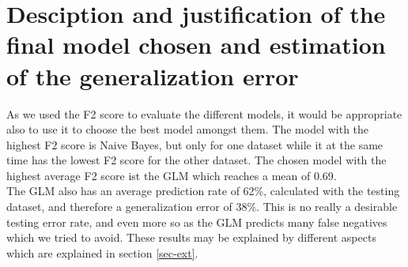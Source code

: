 
\section{Desciption and justification of the final model chosen and estimation of the generalization error}

As we used the F2 score to evaluate the different models, it would be appropriate also to use it to choose the best model amongst them. The model with the highest F2 score is Naive Bayes, but only for one dataset while it at the same time has the lowest F2 score for the other dataset. The chosen model with the highest average F2 score ist the GLM which reaches a mean of 0.69. \\
The GLM also has an average prediction rate of 62\%, calculated with the testing dataset, and therefore a generalization error of 38\%. This is no really a desirable testing error rate, and even more so as the GLM predicts many false negatives which we tried to avoid. These results may be explained by different aspects which are explained in section \ref{sec-ext}.

